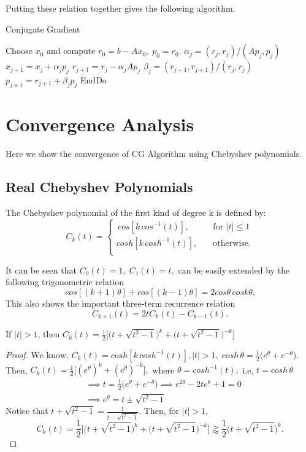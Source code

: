 \documentclass[10pt,a4paper]{article}
\begin{document}
Putting these relation together gives the following algorithm.

\begin{algorithm}
\caption{Conjugate Gradient}
\begin{algorithmic}[1]
\State Choose $x_0$ and compute $r_0=b-Ax_0,\;p_0=r_0.$
	\State $\alpha_j=(r_j,r_j)/(Ap_j,p_j)$
	\State $x_{j+1}=x_j+\alpha_jp_j$
	\State $r_{j+1}=r_j-\alpha_jAp_j$
	\State $\beta_j=(r_{j+1},r_{j+1})/(r_j,r_j)$
	\State $p_{j+1}=r_{j+1}+\beta_jp_j$
\EndFor
\State EndDo
\end{algorithmic}
\end{algorithm}

\newpage

\section{Convergence Analysis}

Here we show the convergence of CG Algorithm using Chebyshev polynomials.

\subsection{Real Chebyshev Polynomials}

\begin{mydef}
The Chebyshev polynomial of the first kind of degree k is defined by:
\[   
C_k(t) = 
     \begin{cases}	
      \, cos[k\,cos^{-1}(t)], &\quad\text{for }|t|\le 1\\
       cosh[k\,cosh^{-1}(t)], &\quad\text{otherwise.}\\
     \end{cases}
\]
\end{mydef}

It can be seen that $C_0(t)=1,\;C_1(t)=t,$ can be easily extended by the following trigonometric relation
$$cos[(k+1)\theta]+cos[(k-1)\theta]=2cos\theta\,cosk\theta.$$
This also shows the important three-term recurrence relation
$$C_{k+1}(t)=2tC_k(t)-C_{k-1}(t).$$

\begin{prop}
If $|t|>1$, then $C_k(t)=\frac{1}{2}\bigg[\Big(t+\sqrt{t^2-1}\Big)^k+\Big(t+\sqrt{t^2-1}\Big)^{-k}\bigg]$
\end{prop}

\begin{proof}
$\text{We know, }C_k(t) = cosh[k\,cosh^{-1}(t)],|t|>1,\;cosh\,\theta=\frac{1}{2}\big(e^\theta+e^{-\theta}\big).$ Then,
$C_k(t) = \frac{1}{2}\Big[(e^\theta)^k+(e^\theta)^{-k}\Big],$ where $\theta = cosh^{-1}(t),$ i.e, $t=cosh\,\theta$ 
\begin{align*}
&\implies t = \frac{1}{2}\big(e^\theta+e^{-\theta}\big) \implies e^{2\theta}-2te^\theta+1=0 \\
&\implies e^\theta = t \pm \sqrt{t^2-1}
\end{align*}
Notice that $t + \sqrt{t^2-1}=\frac{1}{t - \sqrt{t^2-1}}.$ Then, for $|t|>1,$
$$C_k(t)=\frac{1}{2}\bigg[\Big(t+\sqrt{t^2-1}\Big)^k+\Big(t+\sqrt{t^2-1}\Big)^{-k}\bigg]\gtrapprox\frac{1}{2}\Big(t+\sqrt{t^2-1}\Big)^k.$$
\end{proof}
\end{document}
